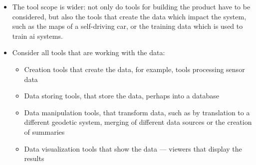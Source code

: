 \begin{itemize}
\item The tool scope is wider: not only do tools for building the product have to be considered,
  but also the tools that create the data which impact the system,
  such as the maps of a self-driving car, or the training data which is used to train \gls{ai} systems.
\item Consider all tools that are working with the data:
  \begin{itemize}
  \item Creation tools that create the data, for example, tools processing sensor data
  \item Data storing tools, that store the data, perhaps into a database
  \item Data manipulation tools, that transform data, such as by translation to a different geodetic system, merging of different data sources or the creation of summaries
  \item Data visualization tools that show the data --- viewers that display the results
  \end{itemize}
  

\end{itemize}

